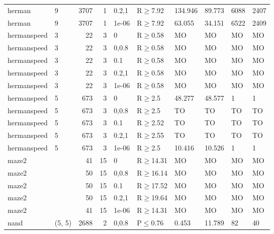 \begin{longtable}{llrrllllll}
 herman        & 9         &   	3707 &   1 & 0.2,1 & R$\geq$7.92  & 134.946  & 89.773   & 6088    & 2407    \\
 herman        & 9         &   	3707 &   1 & 1e-06 & R$\geq$7.92  & 63.055   & 34.151   & 6522    & 2409    \\
 hermanspeed   & 3         &     	22 &   3 & 0     & R$\geq$0.58  & MO       & MO       & MO      & MO      \\
 hermanspeed   & 3         &     	22 &   3 & 0,0.8 & R$\geq$0.58  & MO       & MO       & MO      & MO      \\
 hermanspeed   & 3         &     	22 &   3 & 0.1   & R$\geq$0.58  & MO       & MO       & MO      & MO      \\
 hermanspeed   & 3         &     	22 &   3 & 0.2,1 & R$\geq$0.58  & MO       & MO       & MO      & MO      \\
 hermanspeed   & 3         &     	22 &   3 & 1e-06 & R$\geq$0.58  & MO       & MO       & MO      & MO      \\
 hermanspeed   & 5         &    	673 &   3 & 0     & R$\geq$2.5   & 48.277   & 48.577   & 1       & 1       \\
 hermanspeed   & 5         &    	673 &   3 & 0,0.8 & R$\geq$2.5   & TO       & TO       & TO      & TO      \\
 hermanspeed   & 5         &    	673 &   3 & 0.1   & R$\geq$2.52  & TO       & TO       & TO      & TO      \\
 hermanspeed   & 5         &    	673 &   3 & 0.2,1 & R$\geq$2.55  & TO       & TO       & TO      & TO      \\
 hermanspeed   & 5         &    	673 &   3 & 1e-06 & R$\geq$2.5   & 10.416   & 10.526   & 1       & 1       \\
 maze2         &           &     	41 &  15 & 0     & R$\geq$14.31 & MO       & MO       & MO      & MO      \\
 maze2         &           &     	50 &  15 & 0,0.8 & R$\geq$16.14 & MO       & MO       & MO      & MO      \\
 maze2         &           &     	50 &  15 & 0.1   & R$\geq$17.52 & MO       & MO       & MO      & MO      \\
 maze2         &           &     	50 &  15 & 0.2,1 & R$\geq$19.64 & MO       & MO       & MO      & MO      \\
 maze2         &           &     	41 &  15 & 1e-06 & R$\geq$14.31 & MO       & MO       & MO      & MO      \\
 nand          & (5, 5)    &   	2688 &   2 & 0,0.8 & P$\leq$0.76  & 0.453    & 11.789   & 82      & 40      \\

\end{longtable}
